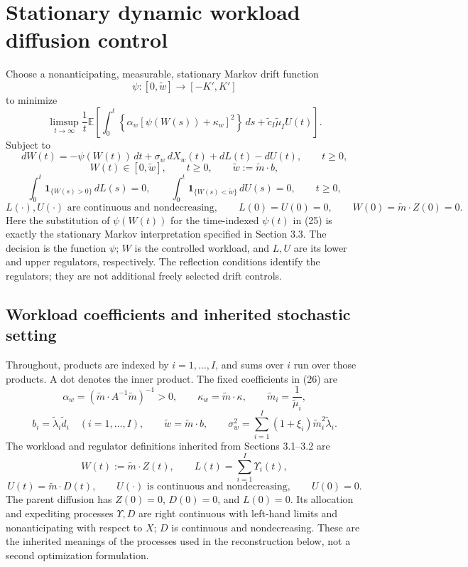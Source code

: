 \documentclass[11pt]{article}
\begin{document}
\section*{Stationary dynamic workload diffusion control}

Choose a nonanticipating, measurable, stationary Markov drift function
\[
\psi:[0,\tilde w]\longrightarrow[-K',K']
\]
to minimize
\begin{equation}
\limsup_{t\to\infty}\frac1t\mathbb E\left[
\int_0^t\left\{\alpha_w[\psi(W(s))+\kappa_w]^2\right\}\,ds
+\tilde c_I\tilde\mu_I U(t)\right].
\tag{26}
\end{equation}
Subject to
\begin{equation}
dW(t)=-\psi(W(t))\,dt+\sigma_w\,dX_w(t)+dL(t)-dU(t),
\qquad t\geq0,
\tag{25}
\end{equation}
\begin{equation}
W(t)\in[0,\tilde w],\qquad t\geq0,
\qquad \tilde w:=\tilde m\cdot b,
\tag{16}
\end{equation}
\begin{equation}
\int_0^t\mathbf1_{\{W(s)>0\}}\,dL(s)=0,
\qquad
\int_0^t\mathbf1_{\{W(s)<\tilde w\}}\,dU(s)=0,
\qquad t\geq0,
\tag{18}
\end{equation}
\[
L(\cdot),U(\cdot)\text{ are continuous and nondecreasing},
\qquad L(0)=U(0)=0,
\qquad W(0)=\tilde m\cdot Z(0)=0.
\]
Here the substitution of \(\psi(W(t))\) for the time-indexed \(\psi(t)\) in (25) is exactly the stationary Markov interpretation specified in Section 3.3. The decision is the function \(\psi\); \(W\) is the controlled workload, and \(L,U\) are its lower and upper regulators, respectively. The reflection conditions identify the regulators; they are not additional freely selected drift controls.

\subsection*{Workload coefficients and inherited stochastic setting}

Throughout, products are indexed by \(i=1,\ldots,I\), and sums over \(i\) run over those products. A dot denotes the inner product. The fixed coefficients in (26) are
\[
\alpha_w=(\tilde m\cdot A^{-1}\tilde m)^{-1}>0,
\qquad \kappa_w=\tilde m\cdot\kappa,
\qquad \tilde m_i=\frac1{\tilde\mu_i},
\]
\[
b_i=\tilde\lambda_i\tilde d_i\quad(i=1,\ldots,I),
\qquad
\tilde w=\tilde m\cdot b,
\qquad
\sigma_w^2=\sum_{i=1}^I(1+\xi_i)\tilde m_i^2\tilde\lambda_i.
\]
The workload and regulator definitions inherited from Sections 3.1--3.2 are
\[
W(t):=\tilde m\cdot Z(t),
\qquad L(t)=\sum_{i=1}^I\Upsilon_i(t),
\]
\begin{equation}
U(t)=\tilde m\cdot D(t),\qquad
U(\cdot)\text{ is continuous and nondecreasing},\qquad U(0)=0.
\tag{15}
\end{equation}
The parent diffusion has \(Z(0)=0\), \(D(0)=0\), and \(L(0)=0\). Its allocation and expediting processes \(\Upsilon,D\) are right continuous with left-hand limits and nonanticipating with respect to \(X\); \(D\) is continuous and nondecreasing. These are the inherited meanings of the processes used in the reconstruction below, not a second optimization formulation.
\end{document}
